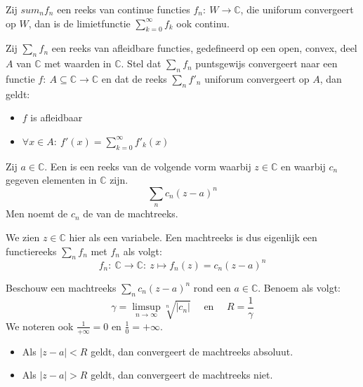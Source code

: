 \documentclass[main.tex]{subfiles}
\begin{document}
\begin{bpr}
  Zij $sum_{n}f_{n}$ een reeks van continue functies $f_{n}:\ W \rightarrow \mathbb{C}$, die uniforum convergeert op $W$, dan is de limietfunctie $\sum_{k=0}^{\infty}f_{k}$ ook continu.
\end{bpr}

\begin{bpr}
  Zij $\sum_{n}f_{n}$ een reeks van afleidbare functies, gedefineerd op een open, convex, deel $A$ van $\mathbb{C}$ met waarden in $\mathbb{C}$.
  Stel dat $\sum_{n}f_{n}$ puntsgewijs convergeert naar een functie $f:\ A\subseteq \mathbb{C} \rightarrow \mathbb{C}$ en dat de reeks $\sum_{n}f'_{n}$ uniforum convergeert op $A$, dan geldt:
  \begin{itemize}
  \item $f$ is afleidbaar
  \item $\forall x\in A:\ f'(x) = \sum_{k=0}^{\infty}f'_{k}(x)$
  \end{itemize}
\end{bpr}

\begin{de}
  Zij $a \in \mathbb{C}$.
  Een  is een reeks van de volgende vorm waarbij $z\in\mathbb{C}$ en waarbij $c_{n}$ gegeven elementen in $\mathbb{C}$ zijn.
  \[ \sum_{n}c_{n}(z-a)^{n} \]
  Men noemt de $c_{n}$ de  van de machtreeks.
\end{de}

\begin{opm}
  We zien $z \in \mathbb{C}$ hier als een variabele.
  Een machtreeks is dus eigenlijk een functiereeks $\sum_{n}f_{n}$ met $f_{n}$ als volgt:
  \[ f_{n}:\ \mathbb{C} \rightarrow \mathbb{C}:\ z \mapsto f_{n}(z) = c_{n}(z-a)^{n} \]
\end{opm}

\begin{bst}
  Beschouw een machtreeks $\sum_{n}c_{n}(z-a)^{n}$ rond een $a\in \mathbb{C}$.
  Benoem als volgt:
  \[ \gamma = \limsup_{n \rightarrow \infty}\sqrt[n]{|c_{n}|} \quad\text{ en }\quad R = \frac{1}{\gamma} \]
  We noteren ook $\frac{1}{+\infty}=0$ en $\frac{1}{0} = +\infty$.
  \begin{itemize}
  \item Als $|z-a| < R$ geldt, dan convergeert de machtreeks absoluut.
  \item Als $|z-a| > R$ geldt, dan convergeert de machtreeks niet.
  \end{itemize}
\end{bst}
\end{document}
